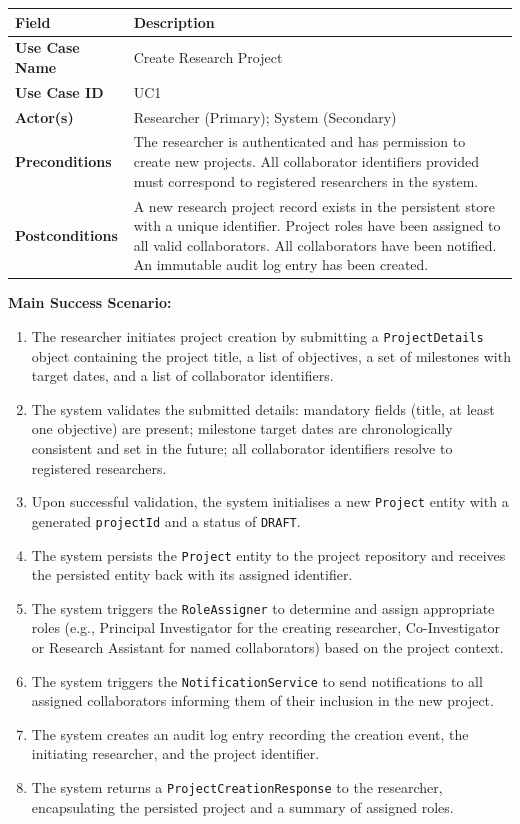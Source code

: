 \documentclass[12pt,a4paper]{article}
\newcommand{\code}[1]{\texttt{\small #1}}
\begin{document}
\begin{center}
\begin{tabularx}{\textwidth}{@{}lL@{}}
  \toprule
  \textbf{Field} & \textbf{Description} \\
  \midrule
  \textbf{Use Case Name}  & Create Research Project \\
  \textbf{Use Case ID}    & UC1 \\
  \textbf{Actor(s)}       & Researcher (Primary); System (Secondary) \\
  \textbf{Preconditions}  & The researcher is authenticated and has permission to create new projects. All collaborator identifiers provided must correspond to registered researchers in the system. \\
  \textbf{Postconditions} & A new research project record exists in the persistent store with a unique identifier. Project roles have been assigned to all valid collaborators. All collaborators have been notified. An immutable audit log entry has been created. \\
  \bottomrule
\end{tabularx}
\end{center}

\textbf{Main Success Scenario:}

\begin{enumerate}
  \item The researcher initiates project creation by submitting a \code{ProjectDetails} object containing the project title, a list of objectives, a set of milestones with target dates, and a list of collaborator identifiers.
  \item The system validates the submitted details: mandatory fields (title, at least one objective) are present; milestone target dates are chronologically consistent and set in the future; all collaborator identifiers resolve to registered researchers.
  \item Upon successful validation, the system initialises a new \code{Project} entity with a generated \code{projectId} and a status of \code{DRAFT}.
  \item The system persists the \code{Project} entity to the project repository and receives the persisted entity back with its assigned identifier.
  \item The system triggers the \code{RoleAssigner} to determine and assign appropriate roles (e.g., Principal Investigator for the creating researcher, Co-Investigator or Research Assistant for named collaborators) based on the project context.
  \item The system triggers the \code{NotificationService} to send notifications to all assigned collaborators informing them of their inclusion in the new project.
  \item The system creates an audit log entry recording the creation event, the initiating researcher, and the project identifier.
  \item The system returns a \code{ProjectCreationResponse} to the researcher, encapsulating the persisted project and a summary of assigned roles.
\end{enumerate}
\end{document}
